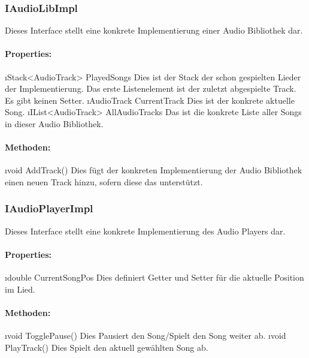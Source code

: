 \documentclass[../entwurf.tex]{subfiles}
\begin{document}
			\subsubsection{IAudioLibImpl}
				Dieses Interface stellt eine konkrete Implementierung einer Audio Bibliothek dar.
				\paragraph{Properties:}
					\begin{itemize}
						\i{Stack<AudioTrack> PlayedSongs} Dies ist der Stack der schon gespielten Lieder der Implementierung.
						Das erste Listenelement ist der zuletzt abgespielte Track. Es gibt keinen Setter.
						\i{AudioTrack CurrentTrack} Dies ist der konkrete aktuelle Song.
						\i{IList<AudioTrack> AllAudioTracks} Das ist die konkrete Liste aller Songs in dieser Audio Bibliothek.
					\end{itemize}
				\paragraph{Methoden:}
					\begin{itemize}
						\i{void AddTrack()} Dies fügt der konkreten Implementierung der Audio Bibliothek einen neuen Track hinzu, sofern
						diese das unterstützt.
					\end{itemize}
			\subsubsection{IAudioPlayerImpl}
				Dieses Interface stellt eine konkrete Implementierung des Audio Players dar.
				\paragraph{Properties:}
					\begin{itemize}
						\i{double CurrentSongPos} Dies definiert Getter und Setter für die aktuelle Position im Lied.
					\end{itemize}
				\paragraph{Methoden:}
					\begin{itemize}
						\i{void TogglePause()} Dies Pausiert den Song/Spielt den Song weiter ab.
						\i{void PlayTrack()} Dies Spielt den aktuell gewählten Song ab.
					\end{itemize}
\end{document}
